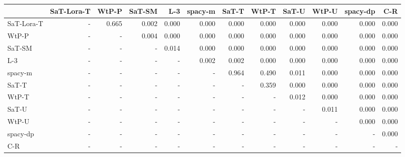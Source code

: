 \begin{tabular}{lrrrrrrrrrrr}
\toprule
 & SaT-Lora-T & WtP-P & SaT-SM & L-3 & spacy-m & SaT-T & WtP-T & SaT-U & WtP-U & spacy-dp & C-R \\
\midrule
SaT-Lora-T & - & 0.665 & 0.002 & 0.000 & 0.000 & 0.000 & 0.000 & 0.000 & 0.000 & 0.000 & 0.000 \\
WtP-P & - & - & 0.004 & 0.000 & 0.000 & 0.000 & 0.000 & 0.000 & 0.000 & 0.000 & 0.000 \\
SaT-SM & - & - & - & 0.014 & 0.000 & 0.000 & 0.000 & 0.000 & 0.000 & 0.000 & 0.000 \\
L-3 & - & - & - & - & 0.002 & 0.002 & 0.000 & 0.000 & 0.000 & 0.000 & 0.000 \\
spacy-m & - & - & - & - & - & 0.964 & 0.490 & 0.011 & 0.000 & 0.000 & 0.000 \\
SaT-T & - & - & - & - & - & - & 0.359 & 0.000 & 0.000 & 0.000 & 0.000 \\
WtP-T & - & - & - & - & - & - & - & 0.012 & 0.000 & 0.000 & 0.000 \\
SaT-U & - & - & - & - & - & - & - & - & 0.011 & 0.000 & 0.000 \\
WtP-U & - & - & - & - & - & - & - & - & - & 0.000 & 0.000 \\
spacy-dp & - & - & - & - & - & - & - & - & - & - & 0.000 \\
C-R & - & - & - & - & - & - & - & - & - & - & - \\
\bottomrule
\end{tabular}

